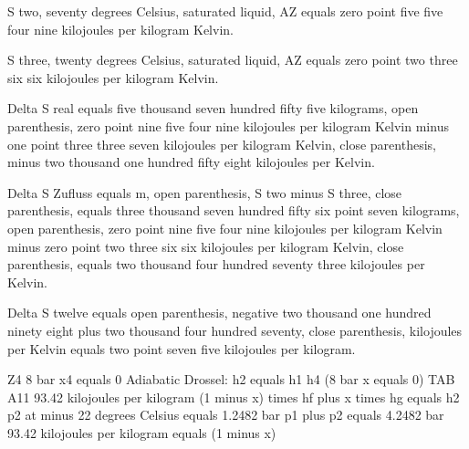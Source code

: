 S two, seventy degrees Celsius, saturated liquid, AZ equals zero point five five four nine kilojoules per kilogram Kelvin.

S three, twenty degrees Celsius, saturated liquid, AZ equals zero point two three six six kilojoules per kilogram Kelvin.

Delta S real equals five thousand seven hundred fifty five kilograms, open parenthesis, zero point nine five four nine kilojoules per kilogram Kelvin minus one point three three seven kilojoules per kilogram Kelvin, close parenthesis, minus two thousand one hundred fifty eight kilojoules per Kelvin.

Delta S Zufluss equals m, open parenthesis, S two minus S three, close parenthesis, equals three thousand seven hundred fifty six point seven kilograms, open parenthesis, zero point nine five four nine kilojoules per kilogram Kelvin minus zero point two three six six kilojoules per kilogram Kelvin, close parenthesis, equals two thousand four hundred seventy three kilojoules per Kelvin.

Delta S twelve equals open parenthesis, negative two thousand one hundred ninety eight plus two thousand four hundred seventy, close parenthesis, kilojoules per Kelvin equals two point seven five kilojoules per kilogram.

Z4 8 bar x4 equals 0  
Adiabatic Drossel: h2 equals h1  
h4 (8 bar x equals 0) TAB A11  
93.42 kilojoules per kilogram  
(1 minus x) times hf plus x times hg equals h2  
p2 at minus 22 degrees Celsius equals 1.2482 bar  
p1 plus p2 equals 4.2482 bar  
93.42 kilojoules per kilogram equals (1 minus x)